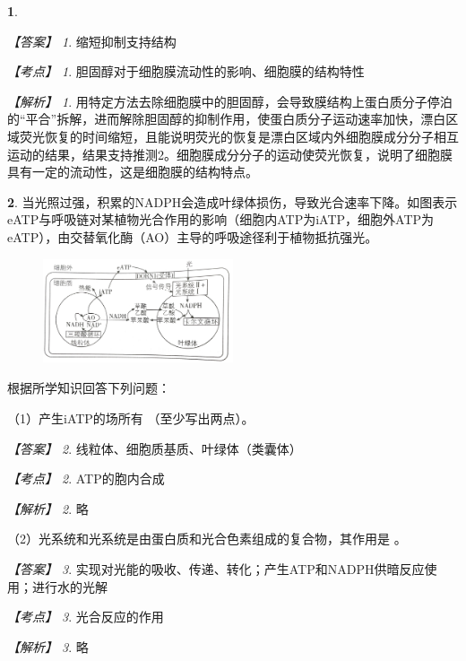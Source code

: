 \documentclass[UTF8, 10pt, a4paper, oneside]{ctexart}
\newcommand{\blank}{ \underbar{\quad$\blacktriangle$\quad} }%
\newcommand{\fs}[1]{{\fangsong #1}}%
\newcommand{\circled}[1]{{\small{\textcircled{\tiny{#1}}}}}%
\newcommand{\Romannumeral}[1]{\uppercase\expandafter{\romannumeral#1}}%
\theoremstyle{definition}
\newtheorem{exercise}{}
\theoremstyle{remark}
\newtheorem*{answer}{【答案】}
\newtheorem*{point}{【考点】}      %
\newtheorem*{explanation}{【解析】}     %
\theoremstyle{plain}
\begin{document}
\begin{exercise}
    \begin{answer}
        缩短\qquad 抑制\qquad 支持\qquad 结构
    \end{answer}
    \begin{point}
        胆固醇对于细胞膜流动性的影响、细胞膜的结构特性
    \end{point}
    \begin{explanation}
        用特定方法去除细胞膜中的胆固醇，会导致膜结构上蛋白质分子停泊的“平合”拆解，进而解除胆固醇的抑制作用，使蛋白质分子运动速率加快，漂白区域荧光恢复的时间缩短，且能说明荧光的恢复是漂白区域内外细胞膜成分分子相互运动的结果，结果支持推测\circled{2}。细胞膜成分分子的运动使荧光恢复，说明了细胞膜具有一定的流动性，这是细胞膜的结构特点。
    \end{explanation}
\end{exercise}
\begin{exercise}

    当光照过强，积累的NADPH会造成叶绿体损伤，导致光合速率下降。如图表示eATP与呼吸链对某植物光合作用的影响（细胞内ATP为iATP，细胞外ATP为eATP），由交替氧化酶（AO）主导的呼吸途径利于植物抵抗强光。

    \begin{figure}[h!]
        \centering
        \includegraphics[width=0.5\textwidth]{assists/19-1.jpg}
    \end{figure}
    \noindent 根据所学知识回答下列问题：

    （1）产生iATP的场所有\blank（至少写出两点）。

    \begin{answer}
        线粒体、细胞质基质、叶绿体（类囊体）
    \end{answer}
    \begin{point}
        ATP的胞内合成
    \end{point}
    \begin{explanation}
        \fs{略}
    \end{explanation}


    （2）光系统\Romannumeral{1}和光系统\Romannumeral{2}是由蛋白质和光合色素组成的复合物，其作用是\blank。

    \begin{answer}
        实现对光能的吸收、传递、转化；产生ATP和NADPH供暗反应使用；进行水的光解
    \end{answer}
    \begin{point}
        光合反应的作用
    \end{point}
    \begin{explanation}
        \fs{略}
    \end{explanation}


\end{exercise}
\end{document}
